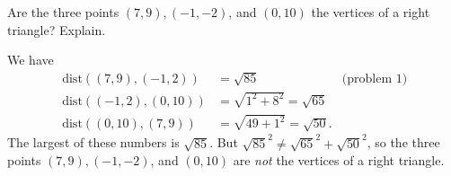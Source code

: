 \documentclass[12pt,fleqn,answers]{exam}
\newcommand{\dist}{\, \mathrm{dist}}
\begin{document}
\begin{questions}
\question[5] Are the three points  $(7,9), (-1,-2)$, and  $(0,10)$ the vertices of
a right triangle? Explain.

\begin{solution}
We have
\begin{align*}
    \dist((7,9), (-1,2)) &= \sqrt{85} &\mbox{(problem 1)}\\
    \dist((-1,2), (0,10)) &= \sqrt{1^2 + 8^2} = \sqrt{65} \\
    \dist((0,10),(7,9)) &= \sqrt{49 + 1^2} = \sqrt{50} .
\end{align*}
The largest of these numbers is $\sqrt{85}$. But $\sqrt{85}^2 \neq \sqrt{65}^2 + \sqrt{50}^2$,
so the three points $(7,9), (-1,-2)$, and  $(0,10)$ are \emph{not} the vertices of a
right triangle.

\end{solution}

\end{questions}
\end{document}
